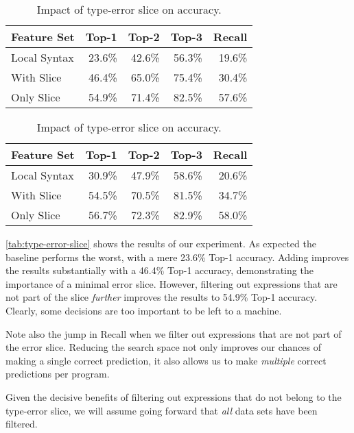 \begin{table}[ht]
  \begin{minipage}{0.49\linewidth}
  \centering
  \linear
  \begin{tabular}{lrrrr}
    \toprule
    Feature Set  & Top-1  & Top-2  & Top-3  & Recall \\
    \midrule
    Local Syntax & 23.6\% & 42.6\% & 56.3\% & 19.6\% \\
    With Slice   & 46.4\% & 65.0\% & 75.4\% & 30.4\% \\
    Only Slice   & 54.9\% & 71.4\% & 82.5\% & 57.6\% \\
    \bottomrule
  \end{tabular}
  \end{minipage}
  \begin{minipage}{0.49\linewidth}
  \centering
  \hiddenF
  \begin{tabular}{lrrrr}
    \toprule
    Feature Set  & Top-1  & Top-2  & Top-3  & Recall \\
    \midrule
    Local Syntax & 30.9\% & 47.9\% & 58.6\% & 20.6\% \\
    With Slice   & 54.5\% & 70.5\% & 81.5\% & 34.7\% \\
    Only Slice   & 56.7\% & 72.3\% & 82.9\% & 58.0\% \\
    \bottomrule
  \end{tabular}
  \end{minipage}
  \caption{
    Impact of type-error slice on accuracy.
  }\label{tab:type-error-slice}
\end{table}

\autoref{tab:type-error-slice} shows the results of our experiment.
%
As expected the baseline performs the worst, with a mere 23.6\% Top-1
accuracy.
%
Adding \InSlice improves the results substantially with a 46.4\% Top-1
accuracy, demonstrating the importance of a minimal error slice.
%
However, filtering out expressions that are not part of the slice
\emph{further} improves the results to 54.9\% Top-1 accuracy.
%
Clearly, some decisions are too important to be left to a machine.

Note also the jump in Recall when we filter out expressions that are not
part of the error slice.
%
Reducing the search space not only improves our chances of making a
single correct prediction, it also allows us to make \emph{multiple}
correct predictions per program.

Given the decisive benefits of filtering out expressions that do not
belong to the type-error slice, we will assume going forward that
\emph{all} data sets have been filtered.


